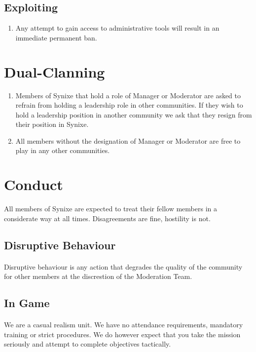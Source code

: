 \documentclass[10pt,a4paper]{article}
\begin{document}
\subsection{Exploiting}
\begin{enumerate}
	\item Any attempt to gain access to administrative tools will result in an immediate permanent ban.
\end{enumerate}
\section{Dual-Clanning} \label{dual-clan}
\begin{enumerate}
	\item Members of Synixe that hold a role of Manager or Moderator are asked to refrain from holding a leadership role in other communities. If they wish to hold a leadership position in another community we ask that they resign from their position in Synixe.
	\item All members without the designation of Manager or Moderator are free to play in any other communities.
\end{enumerate}
\section{Conduct} \label{conduct}
\paragraph{}
All members of Synixe are expected to treat their fellow members in a considerate way at all times. Disagreements are fine, hostility is not.
\subsection{Disruptive Behaviour}
\paragraph{}
Disruptive behaviour is any action that degrades the quality of the community for other members at the discrestion of the Moderation Team.
\subsection{In Game}
\paragraph{}
We are a casual realism unit. We have no attendance requirements, mandatory training or strict procedures. We do however expect that you take the mission seriously and attempt to complete objectives tactically.
\end{document}
